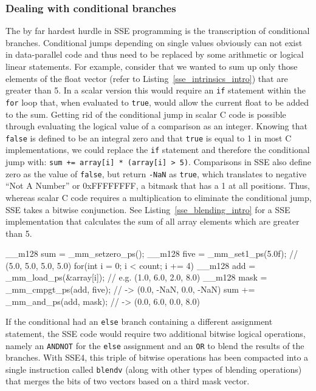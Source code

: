 \subsubsection{Dealing with conditional branches}
\label{conditional_branches} 
The by far hardest hurdle in SSE programming is the transcription of conditional branches. Conditional jumps depending on single values obviously can not exist in data-parallel code and thus need to be replaced by some arithmetic or logical linear statements. For example, consider that we wanted to sum up only those elements of the float vector (refer to Listing~\ref{sse_intrinsics_intro}) that are greater than 5. In a scalar version this would require an \texttt{if} statement within the \texttt{for} loop that, when evaluated to \texttt{true}, would allow the current float to be added to the sum. Getting rid of the conditional jump in scalar C code is possible through evaluating the logical value of a comparison as an integer. Knowing that \texttt{false} is defined to be an integral zero and that \texttt{true} is equal to 1 in most C implementations, we could replace the \texttt{if} statement and therefore the conditional jump with: \texttt{sum += array[i] * (array[i] > 5)}. Comparisons in SSE also define zero as the value of \texttt{false}, but return \texttt{-NaN} as \texttt{true}, which translates to negative ``Not A Number'' or 0xFFFFFFFF, a bitmask that has a 1 at all positions. Thus, whereas scalar C code requires a multiplication to eliminate the conditional jump, SSE takes a bitwise conjunction. See Listing~\ref{sse_blending_intro} for a SSE implementation that calculates the sum of all array elements which are greater than 5.

\begin{code}[caption={Sum of array elements greater than 5}, label=sse_blending_intro]
  __m128 sum = _mm_setzero_ps();
  __m128 five = _mm_set1_ps(5.0f); // (5.0, 5.0, 5.0, 5.0)
  for(int i = 0; i < count; i += 4) {
    __m128 add = _mm_load_ps(&array[i]); // e.g. (1.0, 6.0, 2.0, 8.0)
    __m128 mask = _mm_cmpgt_ps(add, five); // -> (0.0, -NaN, 0.0, -NaN)
    sum += _mm_and_ps(add, mask); // -> (0.0, 6.0, 0.0, 8.0)
  }
\end{code}

If the conditional had an \texttt{else} branch containing a different assignment statement, the SSE code would require two additional bitwise logical operations, namely an \texttt{ANDNOT} for the \texttt{else} assignment and an \texttt{OR} to blend the results of the branches. With SSE4, this triple of bitwise operations has been compacted into a single instruction called \texttt{blendv} (along with other types of blending operations) that merges the bits of two vectors based on a third mask vector. 


